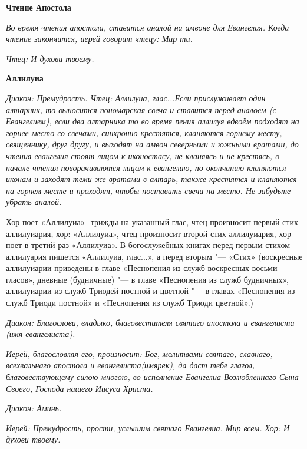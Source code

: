 \medskip
\bfseries Чтение Апостола \normalfont{}

\itshape Во время чтения апостола, ставится аналой на амвоне для Евангелия. Когда чтение закончится, иерей говорит чтецу:\normalfont{} Мир ти.


\itshape  Чтец:\normalfont{} И духови твоему.


\medskip
\bfseries Аллилуиа \normalfont{}


\itshape Диакон:\normalfont{} Премудрость.
\itshape Чтец:\normalfont{} Аллилуиа, глас...\itshape  Если прислуживает один алтарник, то выносится пономарская свеча и ставится перед аналоем (с Евангелием), если два алтарника то во время пения аллилуя вдвоём подходят на горнее место со свечами, синхронно крестятся, кланяются горнему месту, священнику, друг другу, и выходят на амвон северными и южными вратами, до чтения евангелия стоят лицом к иконостасу, не кланяясь и не крестясь, в начале чтения поворачиваются лицом к евангелию, по окончанию кланяются иконам и заходят теми же вратами в алтарь, также крестятся и кланяются на горнем месте и проходят, чтобы поставить свечи на место. Не забудьте убрать аналой.\normalfont{}


\medskip
Хор поет «Аллилуиа»- трижды на указанный глас, чтец произносит первый стих аллилуиария, хор: «Аллилуиа», чтец произносит второй стих аллилуиария, хор поет в третий раз «Аллилуиа». В богослужебных книгах перед первым стихом аллилуария пишется «Аллилуиа, глас...», а перед вторым "--- «Стих» (воскресные аллилуиарии приведены в главе «Песнопения из служб воскресных восьми гласов», дневные (будничные) "--- в главе «Песнопения из служб будничных», аллилуиарии из служб Триодей постной и цветной "--- в главах «Песнопения из служб Триоди постной» и «Песнопения из служб Триоди цветной».)


\itshape Диакон:\normalfont{} Благослови, владыко, благовестителя святаго апостола и евангелиста \itshape (имя евангелиста)\normalfont{}.


\itshape Иерей, благословляя его, произносит:\normalfont{} Бог, молитвами святаго, славнаго, всехвальнаго апостола и евангелиста\itshape  (имярек)\normalfont{}, да даст тебе глагол, благовествующему силою многою, во исполнение Евангелиа Возлюбленнаго Сына Своего, Господа нашего Иисуса Христа.


\itshape Диакон:\normalfont{} Аминь.


\itshape Иерей:\normalfont{} Премудрость, прости, услышим святаго Евангелиа. Мир всем.
\itshape Хор:\normalfont{} И духови твоему.


